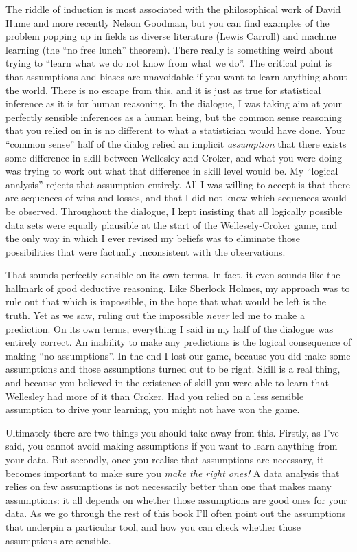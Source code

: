 The riddle of induction is most associated with the philosophical work of David Hume and more recently Nelson Goodman, but you can find examples of the problem popping up in fields as diverse literature (Lewis Carroll) and machine learning (the ``no free lunch'' theorem). There really is something weird about trying to ``learn what we do not know from what we do''. The critical point is that assumptions and biases are unavoidable if you want to learn anything about the world. There is no escape from this, and it is just as true for statistical inference as it is for human reasoning. In the dialogue, I was taking aim at your perfectly sensible inferences as a human being, but the common sense reasoning that you relied on in is no different to what a statistician would have done. Your ``common sense'' half of the dialog relied  an implicit {\it assumption} that there exists some difference in skill between Wellesley and Croker, and what you were doing was trying to work out what that difference in skill level would be. My ``logical analysis'' rejects that assumption entirely. All I was willing to accept is that there are sequences of wins and losses, and that I did not know which sequences would be observed. Throughout the dialogue, I kept insisting that all logically possible data sets were equally plausible at the start of the Wellesely-Croker game, and the only way in which I ever revised my beliefs was to eliminate those possibilities that were factually inconsistent with the observations. 

That sounds perfectly sensible on its own terms. In fact, it even sounds like the hallmark of good deductive reasoning. Like Sherlock Holmes, my approach was to rule out that which is impossible, in the hope that what would be left is the truth. Yet as we saw, ruling out the impossible {\it never} led me to make a prediction. On its own terms, everything I said in my half of the dialogue was entirely correct. An inability to make any predictions is the logical consequence of making ``no assumptions''. In the end I lost our game, because you did make some assumptions and those assumptions turned out to be right. Skill is a real thing, and because you believed in the existence of skill you were able to learn that Wellesley had more of it than Croker. Had you relied on a less sensible assumption to drive your learning, you might not have won the game. 

Ultimately there are two things you should take away from this. Firstly, as I've said, you cannot avoid making assumptions if you want to learn anything from your data. But secondly, once you realise that assumptions are necessary, it becomes important to make sure you {\it make the right ones!} A data analysis that relies on few assumptions is not necessarily better than one that makes many assumptions: it all depends on whether those assumptions are good ones for your data. As we go through the rest of this book I'll often point out the assumptions that underpin a particular tool, and how you can check whether those assumptions are sensible. 

